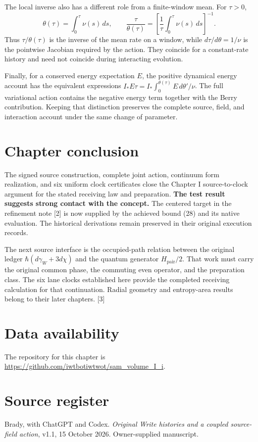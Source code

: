 \documentclass[10pt,twocolumn,letterpaper]{article}
\begin{document}
The local inverse also has a different role from a finite-window mean. For $\tau>0$,
\[
\theta(\tau)=\int_0^\tau\nu(s)\,ds,
\qquad
\frac{\tau}{\theta(\tau)}
=\left[\frac1\tau\int_0^\tau\nu(s)\,ds\right]^{-1}.
\]
Thus $\tau/\theta(\tau)$ is the inverse of the mean rate on a window, while $d\tau/d\theta=1/\nu$ is the pointwise Jacobian required by the action. They coincide for a constant-rate history and need not coincide during interacting evolution.

Finally, for a conserved energy expectation $E$, the positive dynamical energy account has the equivalent expressions $I_*E\tau=I_*\int_0^{\theta(\tau)}E\,d\theta'/\nu$. The full variational action contains the negative energy term together with the Berry contribution. Keeping that distinction preserves the complete source, field, and interaction account under the same change of parameter.


\section{Chapter conclusion}
The signed source construction, complete joint action, continuum form realization, and six uniform clock certificates close the Chapter I source-to-clock argument for the stated receiving law and preparation. \textbf{The test result suggests strong contact with the concept.} The centered target in the refinement note [2] is now supplied by the achieved bound (28) and its native evaluation. The historical derivations remain preserved in their original execution records.

The next source interface is the occupied-path relation between the original ledger $\hbar(d\gamma_W+3d\chi)$ and the quantum generator $H_{\mathrm{pair}}/2$. That work must carry the original common phase, the commuting even operator, and the preparation class. The six lane clocks established here provide the completed receiving calculation for that continuation. Radial geometry and entropy-area results belong to their later chapters. [3]


\section*{Data availability}
The repository for this chapter is \url{https://github.com/iwtbotiwtwot/sam_volume_I_i}.

\section*{Source register}
\begingroup\footnotesize
\noindent[1] Brady, with ChatGPT and Codex. \emph{Original Write histories and a coupled source-field action}, v1.1, 15 October 2026. Owner-supplied manuscript.
\end{document}
